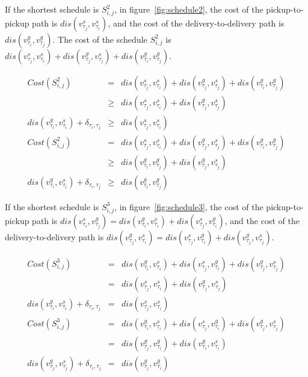 \documentclass[sigconf,anonymous]{aamas}
\begin{document}
If the shortest schedule is $S^2_{i,j}$,
in figure~\ref{fig:schedule2},
the cost of the pickup-to-pickup path is $dis(v^{s}_{\tau_{j}}, v^{s}_{\tau_{i}})$,
and the cost of the delivery-to-delivery path is $dis(v^{g}_{\tau_{i}}, v^{g}_{\tau_{j}})$.
The cost of the schedule $S^2_{i,j}$ is $dis(v^{s}_{\tau_{j}}, v^{s}_{\tau_{i}}) 
+ dis(v^{g}_{\tau_{j}}, v^{s}_{\tau_{j}}) + dis(v^{g}_{\tau_{i}}, v^{g}_{\tau_{j}})$.

\begin{eqnarray}
    \label{eq:cost2}
    Cost(S^{2}_{i,j}) &=& dis(v^s_{\tau_j}, v^s_{\tau_i})+dis(v^g_{\tau_j}, v^s_{\tau_j})
      +dis(v^g_{\tau_i}, v^g_{\tau_j}) \nonumber \\
    & \geq & dis(v^s_{\tau_j}, v^s_{\tau_i})+dis(v^g_{\tau_j}, v^s_{\tau_j}) \nonumber \\
    dis(v^g_{\tau_i}, v^s_{\tau_i})+\delta_{\tau_i, \tau_j} &\geq& dis(v^s_{\tau_j}, v^s_{\tau_i}) \label{eq:p2p2} \\
    Cost(S^{2}_{i,j}) &=& dis(v^s_{\tau_j}, v^s_{\tau_i})+dis(v^g_{\tau_j}, v^s_{\tau_j})
      +dis(v^g_{\tau_i}, v^g_{\tau_j}) \nonumber \\
    & \geq & dis(v^g_{\tau_i}, v^g_{\tau_j}) +dis(v^g_{\tau_j}, v^s_{\tau_j}) \nonumber \\
    dis(v^g_{\tau_i}, v^s_{\tau_i}) +\delta_{\tau_i, \tau_j} &\geq& dis(v^g_{\tau_i}, v^g_{\tau_j}) \label{eq:d2d2}
\end{eqnarray}

If the shortest schedule is $S^3_{i,j}$,
in figure~\ref{fig:schedule3},
the cost of the pickup-to-pickup path is $dis(v^{s}_{\tau_{i}}, v^{g}_{\tau_{j}}) = dis(v^g_{\tau_i}, v^s_{\tau_i}) + dis(v^s_{\tau_j}, v^g_{\tau_i})$,
and the cost of the delivery-to-delivery path is $dis(v^{g}_{\tau_{j}}, v^{s}_{\tau_{i}}) = dis(v^s_{\tau_j}, v^g_{\tau_i}) + dis(v^g_{\tau_j}, v^s_{\tau_j})$.

\begin{eqnarray}
    \label{eq:cost3}
    Cost(S^{3}_{i,j}) &=& dis(v^g_{\tau_i}, v^s_{\tau_i}) + dis(v^s_{\tau_j}, v^g_{\tau_i})
    + dis(v^g_{\tau_j}, v^s_{\tau_j}) \nonumber \\
    & = & dis(v^s_{\tau_j}, v^s_{\tau_i}) + dis(v^g_{\tau_j}, v^s_{\tau_j}) \nonumber \\
    dis(v^g_{\tau_i}, v^s_{\tau_i}) + \delta_{\tau_i, \tau_j} & = & dis(v^s_{\tau_j}, v^s_{\tau_i}) \label{eq:p2p3} \\
    Cost(S^{3}_{i,j}) &=& dis(v^g_{\tau_i}, v^s_{\tau_i}) + dis(v^s_{\tau_j}, v^g_{\tau_i})
    + dis(v^g_{\tau_j}, v^s_{\tau_j}) \nonumber \\
    & = & dis(v^g_{\tau_j}, v^g_{\tau_i}) + dis(v^g_{\tau_i}, v^s_{\tau_i}) \nonumber \\
    dis(v^g_{\tau_j}, v^s_{\tau_j}) + \delta_{\tau_i, \tau_j} & = & dis(v^g_{\tau_j}, v^g_{\tau_i}) \label{eq:d2d3}
\end{eqnarray}
\end{document}
